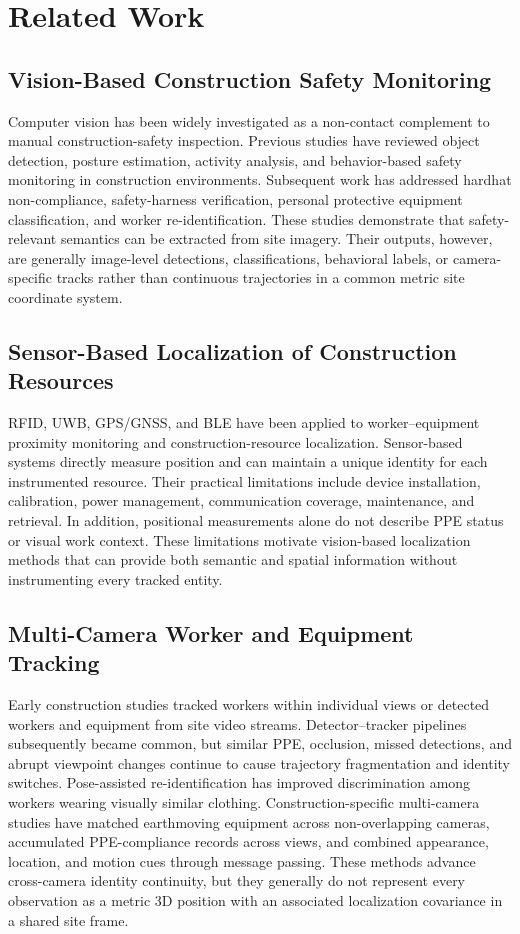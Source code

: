 \section{Related Work}
\label{sec:related_work}

\subsection{Vision-Based Construction Safety Monitoring}
Computer vision has been widely investigated as a non-contact complement to manual construction-safety inspection. Previous studies have reviewed object detection, posture estimation, activity analysis, and behavior-based safety monitoring in construction environments. Subsequent work has addressed hardhat non-compliance, safety-harness verification, personal protective equipment classification, and worker re-identification. These studies demonstrate that safety-relevant semantics can be extracted from site imagery. Their outputs, however, are generally image-level detections, classifications, behavioral labels, or camera-specific tracks rather than continuous trajectories in a common metric site coordinate system.

\subsection{Sensor-Based Localization of Construction Resources}
RFID, UWB, GPS/GNSS, and BLE have been applied to worker--equipment proximity monitoring and construction-resource localization. Sensor-based systems directly measure position and can maintain a unique identity for each instrumented resource. Their practical limitations include device installation, calibration, power management, communication coverage, maintenance, and retrieval. In addition, positional measurements alone do not describe PPE status or visual work context. These limitations motivate vision-based localization methods that can provide both semantic and spatial information without instrumenting every tracked entity.

\subsection{Multi-Camera Worker and Equipment Tracking}
Early construction studies tracked workers within individual views or detected workers and equipment from site video streams. Detector--tracker pipelines subsequently became common, but similar PPE, occlusion, missed detections, and abrupt viewpoint changes continue to cause trajectory fragmentation and identity switches. Pose-assisted re-identification has improved discrimination among workers wearing visually similar clothing. Construction-specific multi-camera studies have matched earthmoving equipment across non-overlapping cameras, accumulated PPE-compliance records across views, and combined appearance, location, and motion cues through message passing. These methods advance cross-camera identity continuity, but they generally do not represent every observation as a metric 3D position with an associated localization covariance in a shared site frame.

